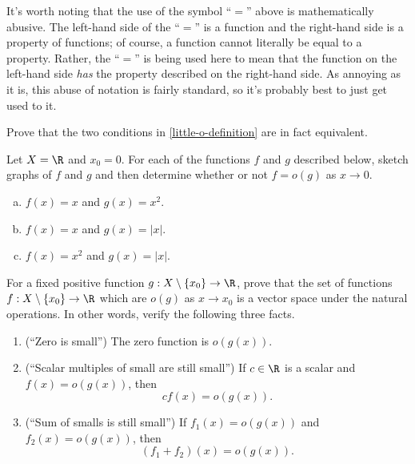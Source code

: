 \begin{remark}
	It's worth noting that the use of the symbol ``$=$'' above is mathematically abusive. The left-hand side of the ``$=$'' is a function and the right-hand side is a property of functions; of course, a function cannot literally be equal to a property. Rather, the ``$=$'' is being used here to mean that the function on the left-hand side \emph{has} the property described on the right-hand side. As annoying as it is, this abuse of notation is fairly standard, so it's probably best to just get used to it. 
\end{remark}

\begin{exercise} \label{little-o-equivalent-exercise}
	Prove that the two conditions in \cref{little-o-definition} are in fact equivalent. 
\end{exercise}

\begin{exercise}
	Let $X = \R$ and $x_0 = 0$. For each of the functions $f$ and $g$ described below, sketch graphs of $f$ and $g$ and then determine whether or not $f = o(g)$ as $x \to 0$.
	\begin{enumerate}[(a)]
		\item $f(x) = x$ and $g(x) = x^2$. 
		\item $f(x) = x$ and $g(x) = |x|$. 
		\item $f(x) = x^2$ and $g(x) = |x|$. 
	\end{enumerate}
\end{exercise}

\begin{exercise} \label{little-o-vector-space}
	For a fixed positive function $g : X \setminus \{x_0\} \to \R$, prove that the set of functions $f : X \setminus \{x_0\} \to \R$ which are $o(g)$ as $x \to x_0$ is a vector space under the natural operations. In other words, verify the following three facts. 
	\begin{enumerate}[(1)]
		\item (``Zero is small'') The zero function is $o(g(x))$. 
		\item (``Scalar multiples of small are still small'') If $c \in \R$ is a scalar and $f(x) = o(g(x))$, then 
		\[ cf(x) = o(g(x)). \] 
		\item (``Sum of smalls is still small'') If $f_1(x) = o(g(x))$ and $f_2(x) = o(g(x))$, then \[ (f_1 + f_2)(x) = o(g(x)). \]
	\end{enumerate}
\end{exercise}


